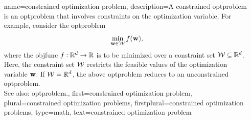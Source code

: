 {name={constrained optimization problem}, 
	description={A constrained \gls{optproblem} is an 
		\gls{optproblem} that involves constraints on the \gls{optimization} variable. 
		For example, consider the \gls{optproblem}
		\[
			\min_{{\bf w} \in \mathcal{W}} f({\bf w}),
		\]
		where the \gls{objfunc} $f: \mathbb{R}^{d} \to \mathbb{R}$ is to be minimized 
		over a constraint set $\mathcal{W} \subseteq \mathbb{R}^{d}$. Here, the constraint 
		set $\mathcal{W}$ restricts the feasible values of the \gls{optimization} variable ${\bf w}$. 
		If $\mathcal{W} = \mathbb{R}^{d}$, the above \gls{optproblem} reduces to an 
		unconstrained \gls{optproblem}. 
					\\ 
		See also: \gls{optproblem}.}, 
	first={constrained optimization problem}, 
	plural={constrained optimization problems},
	firstplural={constrained optimization problems},
	type=math,
	text={constrained optimization problem} 
}

